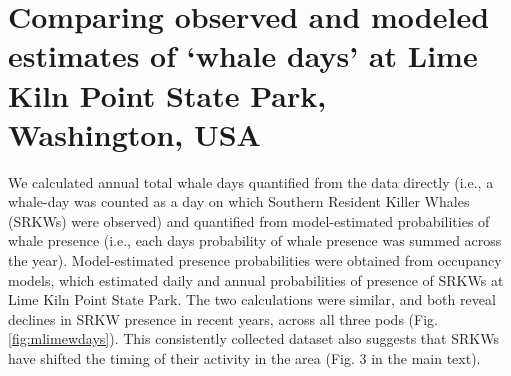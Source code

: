 \documentclass{article}
\begin{document}
\section* {Comparing observed and modeled estimates of `whale days' at Lime Kiln Point State Park, Washington, USA}
\par We calculated annual total whale days quantified from the data directly (i.e., a whale-day was counted as a day on which Southern Resident Killer Whales (SRKWs) were observed) and quantified from model-estimated probabilities of whale presence (i.e., each days probability of whale presence was summed across the year). Model-estimated presence probabilities were obtained from occupancy models, which estimated daily and annual probabilities of presence of SRKWs at Lime Kiln Point State Park. The two calculations were similar, and both reveal declines in SRKW presence in recent years, across all three pods (Fig. \ref{fig:mlimewdays}). This consistently collected dataset also suggests that SRKWs have shifted the timing of their activity in the area (Fig. 3 in the main text).
\end{document}
